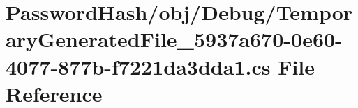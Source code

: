 \hypertarget{_password_hash_2obj_2_debug_2_temporary_generated_file__5937a670-0e60-4077-877b-f7221da3dda1_8cs}{}\section{Password\+Hash/obj/\+Debug/\+Temporary\+Generated\+File\+\_\+5937a670-\/0e60-\/4077-\/877b-\/f7221da3dda1.cs File Reference}
\label{_password_hash_2obj_2_debug_2_temporary_generated_file__5937a670-0e60-4077-877b-f7221da3dda1_8cs}
